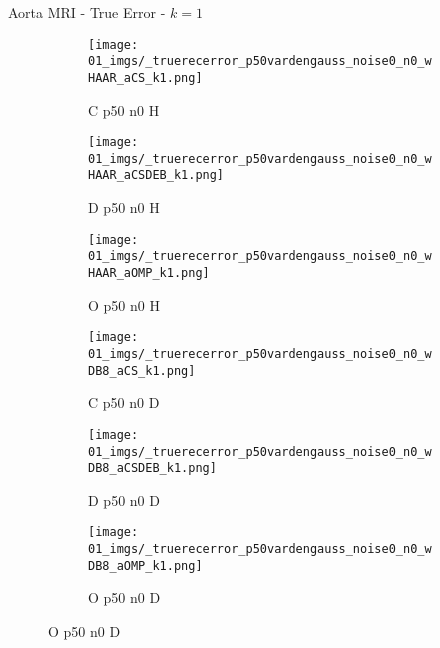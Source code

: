 \begin{frame}{Aorta MRI - True Error - $k=1$}{}
\begin{figure}
\begin{subfigure}{0.13\textwidth}
\texttt{[image: 01\_imgs/\_truerecerror\_p50vardengauss\_noise0\_n0\_wHAAR\_aCS\_k1.png]}
\caption*{\tiny C p50 n0 H}
\end{subfigure}
\begin{subfigure}{0.13\textwidth}
\texttt{[image: 01\_imgs/\_truerecerror\_p50vardengauss\_noise0\_n0\_wHAAR\_aCSDEB\_k1.png]}
\caption*{\tiny D p50 n0 H}
\end{subfigure}
\begin{subfigure}{0.13\textwidth}
\texttt{[image: 01\_imgs/\_truerecerror\_p50vardengauss\_noise0\_n0\_wHAAR\_aOMP\_k1.png]}
\caption*{\tiny O p50 n0 H}
\end{subfigure}
\begin{subfigure}{0.13\textwidth}
\texttt{[image: 01\_imgs/\_truerecerror\_p50vardengauss\_noise0\_n0\_wDB8\_aCS\_k1.png]}
\caption*{\tiny C p50 n0 D}
\end{subfigure}
\begin{subfigure}{0.13\textwidth}
\texttt{[image: 01\_imgs/\_truerecerror\_p50vardengauss\_noise0\_n0\_wDB8\_aCSDEB\_k1.png]}
\caption*{\tiny D p50 n0 D}
\end{subfigure}
\begin{subfigure}{0.13\textwidth}
\texttt{[image: 01\_imgs/\_truerecerror\_p50vardengauss\_noise0\_n0\_wDB8\_aOMP\_k1.png]}
\caption*{\tiny O p50 n0 D}
\end{subfigure}

\vspace{5pt}


\end{figure}
\end{frame}
